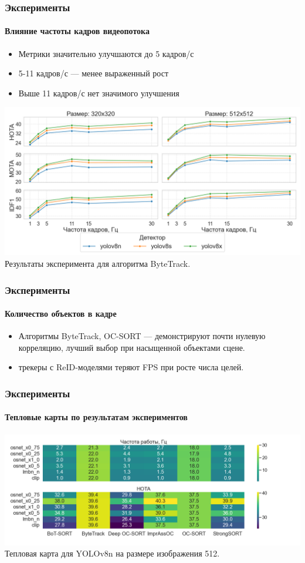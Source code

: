 \documentclass{beamer} %
\begin{document}
\begin{frame}
  \frametitle{Эксперименты}
  \framesubtitle{Влияние частоты кадров видеопотока}
  \begin{itemize}
    \item Метрики значительно улучшаются до 5 кадров/с
    \item 5-11 кадров/с — менее выраженный рост
    \item Выше 11 кадров/с нет значимого улучшения
  \end{itemize}
  \centering
  \includegraphics[width=0.7\linewidth]{images/plots/fps_vs_metric/ByteTrack.png}\\
  \small Результаты эксперимента для алгоритма ByteTrack.
\end{frame}

\begin{frame}
  \frametitle{Эксперименты}
  \framesubtitle{Количество объектов в кадре}
  
  \begin{itemize}
    \item Алгоритмы ByteTrack, OC-SORT — демонстрируют почти нулевую корреляцию, лучший выбор при насыщенной объектами сцене.
    \item трекеры с ReID-моделями теряют FPS при росте числа целей.
  \end{itemize}

\end{frame}

\begin{frame}
  \frametitle{Эксперименты}
  \framesubtitle{Тепловые карты по результатам экспериментов}
  \centering
  \includegraphics[width=\linewidth]{images/plots/heatmap_fps_hota_vs_tracker_reid/heatmap_fps_hota_yolov8n_size512.png}\\
  \small Тепловая карта для YOLOv8n на размере изображения 512.
\end{frame}
\end{document}
